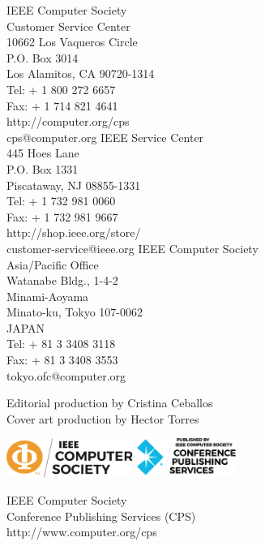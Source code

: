 \begin{center}
\small
\begin{multicols}{3}
IEEE Computer Society\\
Customer Service Center\\
10662 Los Vaqueros Circle\\
P.O. Box 3014\\
Los Alamitos, CA 90720-1314\\
Tel: + 1 800 272 6657\\
Fax: + 1 714 821 4641\\
http://computer.org/cps\\
cps@computer.org
\columnbreak
IEEE Service Center\\
445 Hoes Lane\\
P.O. Box 1331\\
Piscataway, NJ 08855-1331\\
Tel: + 1 732 981 0060\\
Fax: + 1 732 981 9667\\
http://shop.ieee.org/store/\\
customer-service@ieee.org
\columnbreak
IEEE Computer Society\\
Asia/Pacific Office\\
Watanabe Bldg., 1-4-2\\
Minami-Aoyama\\
Minato-ku, Tokyo 107-0062\\
JAPAN\\
Tel: + 81 3 3408 3118\\
Fax: + 81 3 3408 3553\\
tokyo.ofc@computer.org
\end{multicols}
\end{center}

\begin{center}
Editorial production by Cristina Ceballos\\
Cover art production by Hector Torres
\end{center}

\begin{center}
\includegraphics[height=0.5in]{../images/ieee-cs-logo}
\quad\quad
\includegraphics[height=0.5in]{../images/ieee-cps-logo}
\end{center}

\begin{center}
IEEE Computer Society\\
Conference Publishing Services (CPS)\\
http://www.computer.org/cps
\end{center}

